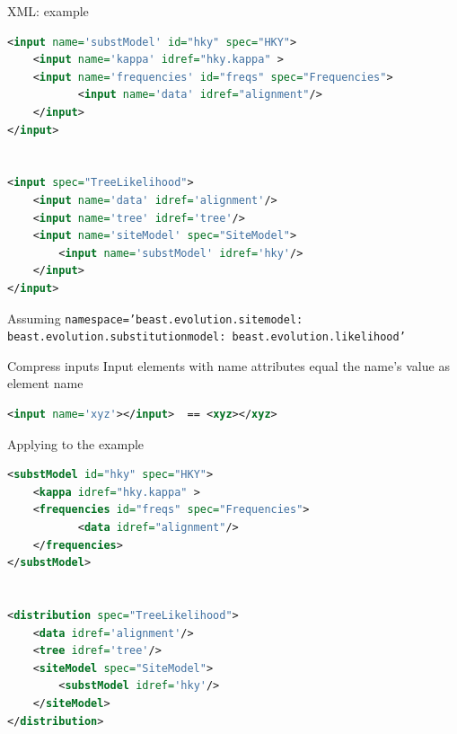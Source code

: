 \documentclass{beamer}
\theoremstyle{definition}
\begin{document}
\begin{frame}[containsverbatim]{XML: example}

{\small

\begin{lstlisting}[language=XML]
<input name='substModel' id="hky" spec="HKY">
    <input name='kappa' idref="hky.kappa" >
    <input name='frequencies' id="freqs" spec="Frequencies">
           <input name='data' idref="alignment"/>
    </input>
</input>


<input spec="TreeLikelihood">
    <input name='data' idref='alignment'/>
    <input name='tree' idref='tree'/>
    <input name='siteModel' spec="SiteModel">
        <input name='substModel' idref='hky'/>
    </input>
</input>
\end{lstlisting}


\color{blue}Assuming {\tt namespace='beast.evolution.sitemodel:
beast.evolution.substitutionmodel:\
beast.evolution.likelihood'}
}
\end{frame}


\begin{frame}[containsverbatim]{Compress inputs}
Input elements with name attributes equal the name's value as element name

\begin{lstlisting}[language=XML]
<input name='xyz'></input>  == <xyz></xyz>
\end{lstlisting}

Applying to the example


{\small
\begin{lstlisting}[language=XML]
<substModel id="hky" spec="HKY">
    <kappa idref="hky.kappa" >
    <frequencies id="freqs" spec="Frequencies">
           <data idref="alignment"/>
    </frequencies>
</substModel>


<distribution spec="TreeLikelihood">
    <data idref='alignment'/>
    <tree idref='tree'/>
    <siteModel spec="SiteModel">
        <substModel idref='hky'/>
    </siteModel>
</distribution>
\end{lstlisting}
}
\end{frame}
\end{document}
